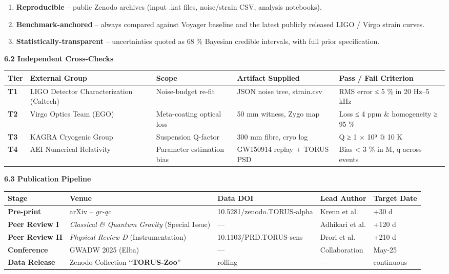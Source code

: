 \documentclass[]{article}
\begin{document}
\begin{enumerate}
\def\labelenumi{\arabic{enumi}.}
\item
  \textbf{Reproducible} -- public Zenodo archives (input .kat files,
  noise/strain CSV, analysis notebooks).
\item
  \textbf{Benchmark-anchored} -- always compared against Voyager
  baseline and the latest publicly released LIGO / Virgo strain curves.
\item
  \textbf{Statistically-transparent} -- uncertainties quoted as 68 \%
  Bayesian credible intervals, with full prior specification.
\end{enumerate}

\textbf{6.2 Independent Cross-Checks}

\begin{longtable}[]{@{}lllll@{}}
\toprule
\textbf{Tier} & \textbf{External Group} & \textbf{Scope} &
\textbf{Artifact Supplied} & \textbf{Pass / Fail
Criterion}\tabularnewline
\midrule
\endhead
\textbf{T1} & LIGO Detector Characterization (Caltech) & Noise-budget
re-fit & JSON noise tree, strain.csv & RMS error ≤ 5 \% in 20 Hz--5
kHz\tabularnewline
\textbf{T2} & Virgo Optics Team (EGO) & Meta-coating optical loss & 50
mm witness, Zygo map & Loss ≤ 4 ppm \& homogeneity ≥ 95
\%\tabularnewline
\textbf{T3} & KAGRA Cryogenic Group & Suspension Q-factor & 300 mm
fibre, cryo log & Q ≥ 1 × 10⁹ @ 10 K\tabularnewline
\textbf{T4} & AEI Numerical Relativity & Parameter estimation bias &
GW150914 replay + TORUS PSD & Bias \textless{} 3 \% in M, q across
events\tabularnewline
\bottomrule
\end{longtable}

\textbf{6.3 Publication Pipeline}

\begin{longtable}[]{@{}lllll@{}}
\toprule
\textbf{Stage} & \textbf{Venue} & \textbf{Data DOI} & \textbf{Lead
Author} & \textbf{Target Date}\tabularnewline
\midrule
\endhead
\textbf{Pre-print} & arXiv -- \emph{gr-qc} & 10.5281/zenodo.TORUS-alpha
& Krenn et al. & +30 d\tabularnewline
\textbf{Peer Review I} & \emph{Classical \& Quantum Gravity} (Special
Issue) & --- & Adhikari et al. & +120 d\tabularnewline
\textbf{Peer Review II} & \emph{Physical Review D} (Instrumentation) &
10.1103/PRD.TORUS-sens & Drori et al. & +210 d\tabularnewline
\textbf{Conference} & GWADW 2025 (Elba) & --- & Collaboration &
May-25\tabularnewline
\textbf{Data Release} & Zenodo Collection ``\textbf{TORUS-Zoo}'' &
rolling & --- & continuous\tabularnewline
\bottomrule
\end{longtable}
\end{document}
